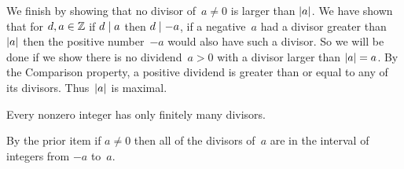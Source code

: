 \documentclass{test}  %
\begin{document}
\begin{problem}
\begin{exes}
\begin{answer}
  We finish by showing that no divisor of~$a\neq 0$ is larger than $\lvert a\rvert$.
  We have shown that for $d,a\in\mathbb{Z}$ if $d\mid a$ then $d\mid -a$,
  if a negative~$a$ had a divisor greater than~$\lvert a\rvert$ then the
  positive number~$-a$ would also have such a divisor.
  So we will be done if
  we show there is no dividend~$a>0$ with a divisor larger than $\lvert a\rvert=a$.
  By the Comparison property, a positive dividend is greater than or 
  equal to any of its divisors. 
  Thus~$\lvert a\rvert$ is maximal.
\end{answer}
\begin{exercise}
  Every nonzero integer has only finitely many divisors.
\end{exercise}
\begin{answer}
  By the prior item if $a\neq 0$ then all of the divisors of~$a$
  are in the interval of integers from $-a$ to~$a$. 
\end{answer}

\end{exes}
\end{problem}
\end{document}
